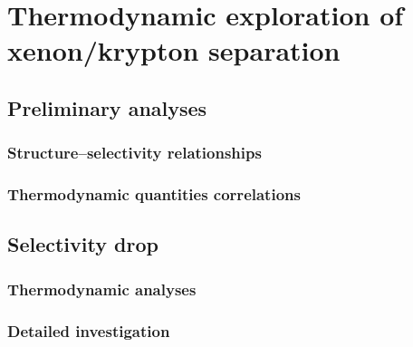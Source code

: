 \documentclass[main]{subfiles}
\begin{document}
\chapter{Thermodynamic exploration of xenon/krypton separation}
\vspace*{-1\baselineskip}
\section{Preliminary analyses}

\subsection{Structure--selectivity relationships}

\subsection{Thermodynamic quantities correlations}

\section{Selectivity drop}

\subsection{Thermodynamic analyses}

\subsection{Detailed investigation}


\OnlyInSubfile{\printglobalbibliography}
\end{document}
